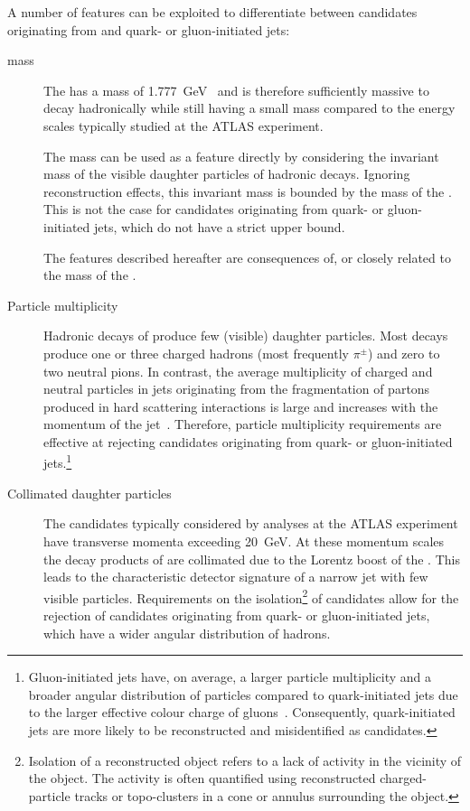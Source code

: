A number of features can be exploited to differentiate between
\tauhadvis candidates originating from \tauhad and quark- or
gluon-initiated jets:
\begin{description}

\item[\taulepton mass] The \taulepton has a mass of
  \SI{1.777}{\GeV}~\cite{pdg2020} and is therefore sufficiently massive to decay
  hadronically while still having a small mass compared to the energy scales
  typically studied at the ATLAS experiment.

  The \taulepton mass can be used as a feature directly by considering the
  invariant mass of the visible daughter particles of hadronic \taulepton
  decays. Ignoring reconstruction effects, this invariant mass is bounded by the
  mass of the \taulepton. This is not the case for \tauhadvis candidates
  originating from quark- or gluon-initiated jets, which do not have a strict
  upper bound.

  The features described hereafter are consequences of, or closely
  related to the mass of the \taulepton.

\item[Particle multiplicity] Hadronic decays of \tauleptons produce
  few (visible) daughter particles. Most decays produce one or three
  charged hadrons (most frequently $\pi^{\pm}$) and zero to two
  neutral pions.
  In contrast, the average multiplicity of charged and neutral particles in jets
  originating from the fragmentation of partons produced in hard scattering
  interactions is large and increases with the momentum of the
  jet~\cite{Ellis:1996mzs,STDM-2015-12}. Therefore, particle multiplicity
  requirements are effective at rejecting \tauhadvis candidates originating from
  quark- or gluon-initiated jets.\footnote{Gluon-initiated jets have, on
    average, a larger particle multiplicity and a broader angular distribution
    of particles compared to quark-initiated jets due to the larger effective
    colour charge of gluons~\cite{Ellis:1996mzs}. Consequently, quark-initiated
    jets are more likely to be reconstructed and misidentified as \tauhadvis
    candidates.}

\item[Collimated daughter particles] The \tauhadvis candidates typically
  considered by analyses at the ATLAS experiment have transverse momenta
  exceeding \SI{20}{\GeV}. At these momentum scales the decay products of
  \tauleptons are collimated due to the Lorentz boost of the \taulepton. This
  leads to the characteristic detector signature of a narrow jet with few
  visible particles. Requirements on the isolation\footnote{Isolation of a
    reconstructed object refers to a lack of activity in the vicinity of the
    object. The activity is often quantified using reconstructed
    charged-particle tracks or topo-clusters in a cone or annulus surrounding
    the object.} of \tauhadvis candidates allow for the rejection of candidates
  originating from quark- or gluon-initiated jets, which have a wider angular
  distribution of hadrons.


\end{description}

